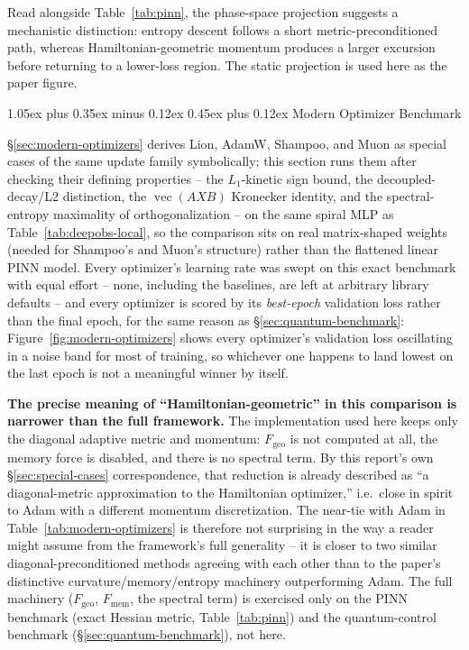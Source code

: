 \documentclass[10pt,twocolumn]{article}
\makeatletter
\renewcommand\subsection{\@startsection{subsection}{2}{0pt}%
  {1.05ex plus 0.35ex minus 0.12ex}%
  {0.45ex plus 0.12ex}%
  {\normalsize\bfseries}}
\makeatother
\begin{document}
Read alongside Table~\ref{tab:pinn}, the phase-space projection suggests a
mechanistic distinction: entropy descent follows a short metric-preconditioned
path, whereas Hamiltonian-geometric momentum produces a larger excursion
before returning to a lower-loss region. The static projection is used here
as the paper figure.

\subsection{Modern Optimizer Benchmark}
\label{sec:modern-benchmark}

\S\ref{sec:modern-optimizers} derives Lion, AdamW, Shampoo, and Muon as
special cases of the same update family symbolically; this section runs them
after checking their defining properties -- the $L_1$-kinetic sign bound, the
decoupled-decay/L2 distinction, the $\operatorname{vec}(AXB)$ Kronecker
identity, and the spectral-entropy maximality of orthogonalization -- on the same spiral MLP as
Table~\ref{tab:deepobs-local}, so the comparison sits on real matrix-shaped
weights (needed for Shampoo's and Muon's structure) rather than the flattened
linear PINN model. Every optimizer's learning rate was swept on this exact
benchmark with equal effort -- none, including the baselines, are left at
arbitrary library defaults -- and every optimizer is scored by its
\emph{best-epoch} validation loss rather than the final epoch, for the same
reason as \S\ref{sec:quantum-benchmark}: Figure~\ref{fig:modern-optimizers}
shows every optimizer's validation loss oscillating in a noise band for most
of training, so whichever one happens to land lowest on the last epoch is not
a meaningful winner by itself.

\textbf{The precise meaning of ``Hamiltonian-geometric'' in this comparison
is narrower than the full framework.} The implementation used here keeps only the
diagonal adaptive metric and momentum: $F_{\mathrm{geo}}$ is not computed at
all, the memory force is disabled, and there is no spectral term. By this report's own
\S\ref{sec:special-cases} correspondence, that reduction is already
described as ``a diagonal-metric approximation to the Hamiltonian
optimizer,'' i.e.\ close in spirit to Adam with a different momentum
discretization. The near-tie with Adam in
Table~\ref{tab:modern-optimizers} is therefore not surprising in the way a
reader might assume from the framework's full generality -- it is closer to
two similar diagonal-preconditioned methods agreeing with each other than to
the paper's distinctive curvature/memory/entropy machinery outperforming
Adam. The full machinery ($F_{\mathrm{geo}}$, $F_{\mathrm{mem}}$, the
spectral term) is exercised only on the PINN benchmark (exact Hessian
metric, Table~\ref{tab:pinn}) and the quantum-control benchmark
(\S\ref{sec:quantum-benchmark}), not here.
\end{document}
